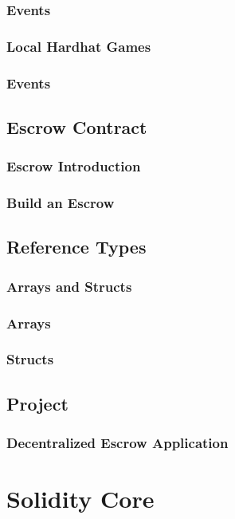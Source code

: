 \documentclass[a4paper, oneside]{book}
\begin{document}
\subsection{Events}
\subsection{Local Hardhat Games}
\subsection{Events}

\section{Escrow Contract}
\subsection{Escrow Introduction}
\subsection{Build an Escrow}

\section{Reference Types}
\subsection{Arrays and Structs}
\subsection{Arrays}
\subsection{Structs}

\section{Project}
\subsection{Decentralized Escrow Application}

\chapter{Solidity Core}
\end{document}
